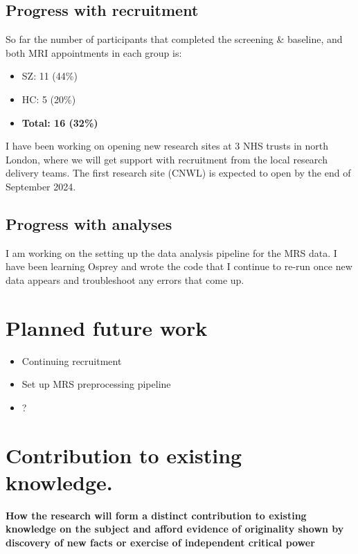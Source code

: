 \documentclass[
  letterpaper,
  DIV=11,
  numbers=noendperiod]{scrartcl}
\providecommand{\tightlist}{%
  \setlength{\itemsep}{0pt}\setlength{\parskip}{0pt}}\usepackage{longtable,booktabs,array}
\begin{document}
\subsection{Progress with recruitment}\label{progress-with-recruitment}

So far the number of participants that completed the screening \&
baseline, and both MRI appointments in each group is:

\begin{itemize}
\tightlist
\item
  SZ: 11 (44\%)
\item
  HC: 5 (20\%)
\item
  \textbf{Total: 16 (32\%)}
\end{itemize}

I have been working on opening new research sites at 3 NHS trusts in
north London, where we will get support with recruitment from the local
research delivery teams. The first research site (CNWL) is expected to
open by the end of September 2024.

\subsection{Progress with analyses}\label{progress-with-analyses}

I am working on the setting up the data analysis pipeline for the MRS
data. I have been learning Osprey and wrote the code that I continue to
re-run once new data appears and troubleshoot any errors that come up.

\section{Planned future work}\label{planned-future-work}

\begin{itemize}
\tightlist
\item
  Continuing recruitment
\item
  Set up MRS preprocessing pipeline
\item
  ?
\end{itemize}

\section{Contribution to existing
knowledge.}\label{contribution-to-existing-knowledge.}

\textbf{How the research will form a distinct contribution to existing
knowledge on the subject and afford evidence of originality shown by
discovery of new facts or exercise of independent critical power}
\end{document}
